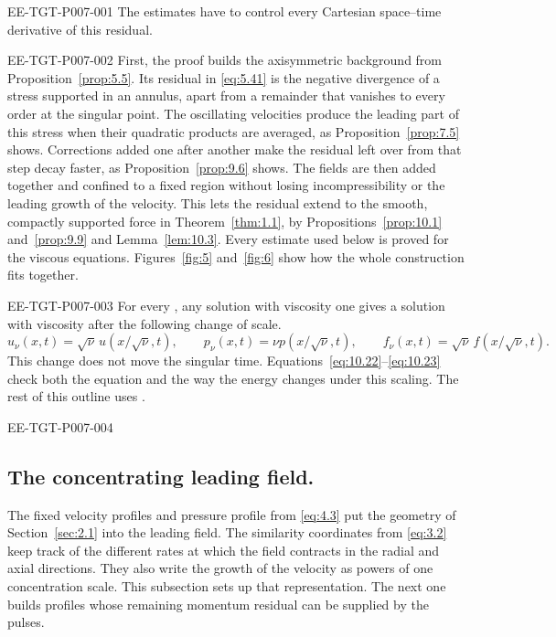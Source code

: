 %
\begin{EESegment}{EE-TGT-P007-001}
The estimates have to control every Cartesian space--time derivative of this residual.
\end{EESegment}

\begin{EESegment}{EE-TGT-P007-002}
First, the proof builds the axisymmetric background
 from Proposition~\ref{prop:5.5}. Its residual in
\eqref{eq:5.41} is the negative divergence
of a stress supported in an annulus, apart from a remainder that vanishes to every order at the
singular point. The oscillating velocities produce the leading part of this stress when their
quadratic products are averaged, as Proposition~\ref{prop:7.5} shows. Corrections added one after
another make the residual left over from that step decay faster, as Proposition~\ref{prop:9.6}
shows. The fields are then added together and confined to a fixed region without losing
incompressibility or the leading growth of the velocity. This lets the residual extend to the smooth,
compactly supported force in Theorem~\ref{thm:1.1}, by Propositions~\ref{prop:10.1}
and~\ref{prop:9.9} and Lemma~\ref{lem:10.3}. Every estimate used below is proved for the viscous
equations. Figures~\ref{fig:5} and~\ref{fig:6} show how the whole construction fits together.
\end{EESegment}

\begin{EESegment}{EE-TGT-P007-003}
For every , any solution with viscosity one gives a solution with
viscosity  after the following change of scale.
\[
 u_\nu(x,t)=\sqrt{\nu}\,u(x/\sqrt{\nu},t),\qquad
 p_\nu(x,t)=\nu p(x/\sqrt{\nu},t),\qquad
 f_\nu(x,t)=\sqrt{\nu}\,f(x/\sqrt{\nu},t).
\]
This change does not move the singular time. Equations~\eqref{eq:10.22}--\eqref{eq:10.23}
check both the equation and the way the energy changes under this scaling. The rest of this
outline uses .
\end{EESegment}

\begin{EESegment}{EE-TGT-P007-004}
\subsection{The concentrating leading field.}\label{sec:3.1}
The fixed velocity profiles  and pressure profile
 from \eqref{eq:4.3} put the geometry of Section~\ref{sec:2.1} into the
leading field. The similarity coordinates  from \eqref{eq:3.2}
keep track of the different rates at which the field contracts in the radial and axial directions.
They also write the growth of the velocity as powers of one concentration scale. This subsection
sets up that representation. The next one builds profiles whose remaining momentum residual can
be supplied by the pulses.
\end{EESegment}

